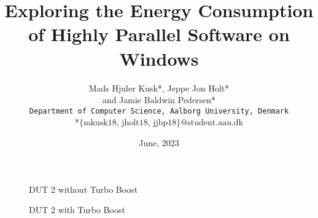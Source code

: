 \documentclass[a4paper, 10pt, english]{article}
\begin{document}
\newpage
\title{\huge Exploring the Energy Consumption of Highly Parallel Software on Windows}
\author{
Mads Hjuler Kusk*, Jeppe Jon Holt*\\ and Jamie Baldwin Pedersen*\\
\texttt{Department of Computer Science, Aalborg University, Denmark}\\
*\texttt{$\text{\{mkusk18, jholt18, jjbp18\}@student.aau.dk}$}
}
\date{{\Large June, 2023}}

\thispagestyle{empty}



%     
%     

\begin{figure}[H]
  \centering
  \begin{subfigure}[b]{0.45\textwidth}
    \centering
    
  \end{subfigure}
  \hfill
  \begin{subfigure}[b]{0.45\textwidth}
    \centering
    
  \end{subfigure}
  \caption*{DUT 2 without Turbo Boost}
\end{figure}

\begin{figure}[H]
  \centering
  \begin{subfigure}[b]{0.45\textwidth}
    \centering
    
  \end{subfigure}
  \hfill
  \begin{subfigure}[b]{0.45\textwidth}
    \centering
    
  \end{subfigure}
  \caption*{DUT 2 with Turbo Boost}
\end{figure}
\end{document}
